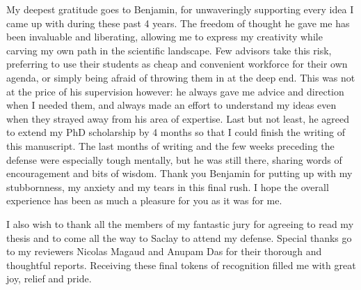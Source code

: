 My deepest gratitude goes to Benjamin, for unwaveringly supporting every idea I came up with during these past 4 years. The freedom of thought he gave me has been invaluable and liberating, allowing me to express my creativity while carving my own path in the scientific landscape. Few advisors take this risk, preferring to use their students as cheap and convenient workforce for their own agenda, or simply being afraid of throwing them in at the deep end. This was not at the price of his supervision however: he always gave me advice and direction when I needed them, and always made an effort to understand my ideas even when they strayed away from his area of expertise. Last but not least, he agreed to extend my PhD scholarship by 4 months so that I could finish the writing of this manuscript. The last months of writing and the few weeks preceding the defense were especially tough mentally, but he was still there, sharing words of encouragement and bits of wisdom. Thank you Benjamin for putting up with my stubbornness, my anxiety and my tears in this final rush. I hope the overall experience has been as much a pleasure for you as it was for me.

I also wish to thank all the members of my fantastic jury for agreeing to read my thesis and to come all the way to Saclay to attend my defense. Special thanks go to my reviewers Nicolas Magaud and Anupam Das for their thorough and thoughtful reports. Receiving these final tokens of recognition filled me with great joy, relief and pride. 